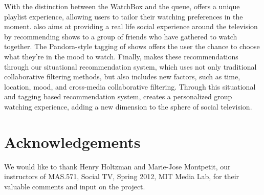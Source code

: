 With the distinction between the WatchBox and the queue, {\sys} offers a unique playlist experience, allowing users to tailor their watching preferences in the moment.  {\sys} also aims at providing a real life social experience around the television by recommending shows to a group of friends who have gathered to watch together.  The Pandora-style tagging of shows offers the user the chance to choose what they're in the mood to watch.  Finally, {\sys} makes these recommendations through our situational recommendation system, which uses not only traditional collaborative filtering methods, but also includes new factors, such as time, location, mood, and cross-media collaborative filtering.  Through this situational and tagging based recommendation system, {\sys} creates a personalized group watching experience, adding a new dimension to the sphere of social television.


\section{Acknowledgements}
We would like to thank Henry Holtzman and Marie-Jose Montpetit, our instructors of MAS.571, Social TV, Spring 2012, MIT Media Lab, for their valuable comments and input on the project.

